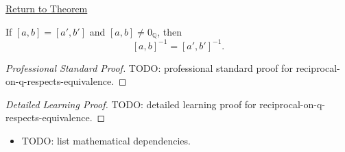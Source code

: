 \newpage
{}
\label{prf:reciprocal-on-q-respects-equivalence}

\begin{remark*}[Return]
\hyperref[lem:reciprocal-on-q-respects-equivalence]{Return to Theorem}
\end{remark*}

\begin{lemma*}
If $[a,b]=[a',b']$ and $[a,b]\ne 0_{\mathbb{Q}}$, then
\[
[a,b]^{-1}=[a',b']^{-1}.
\]
\end{lemma*}

\begin{proof}[Professional Standard Proof]
\LRAProofBodyStart
TODO: professional standard proof for reciprocal-on-q-respects-equivalence.
\end{proof}

\begin{proof}[Detailed Learning Proof]
\LRAProofBodyStart
TODO: detailed learning proof for reciprocal-on-q-respects-equivalence.
\end{proof}

\begin{remark*}
\end{remark*}

\begin{dependencies}
\begin{itemize}
  \item TODO: list mathematical dependencies.
\end{itemize}
\end{dependencies}

\clearpage

